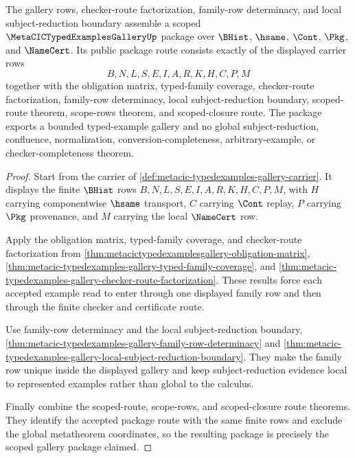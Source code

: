 \begin{theorem}
\label{thm:metacic-typed-examples-gallery-scoped-package}
The gallery rows, checker-route factorization, family-row determinacy, and local subject-reduction boundary assemble a scoped $\MetaCICTypedExamplesGalleryUp$ package over $\BHist$, $\hsame$, $\Cont$, $\Pkg$, and $\NameCert$. Its public package route consists exactly of the displayed carrier rows
$$
B,N,L,S,E,I,A,R,K,H,C,P,M
$$
together with the obligation matrix, typed-family coverage, checker-route factorization, family-row determinacy, local subject-reduction boundary, scoped-route theorem, scope-rows theorem, and scoped-closure route. The package exports a bounded typed-example gallery and no global subject-reduction, confluence, normalization, conversion-completeness, arbitrary-example, or checker-completeness theorem.
\end{theorem}
\begin{proof}
Start from the carrier of \autoref{def:metacic-typedexamples-gallery-carrier}. It displays the finite $\BHist$ rows $B,N,L,S,E,I,A,R,K,H,C,P,M$, with $H$ carrying componentwise $\hsame$ transport, $C$ carrying $\Cont$ replay, $P$ carrying $\Pkg$ provenance, and $M$ carrying the local $\NameCert$ row.

Apply the obligation matrix, typed-family coverage, and checker-route factorization from \autoref{thm:metacictypedexamplesgallery-obligation-matrix}, \autoref{thm:metacic-typedexamples-gallery-typed-family-coverage}, and \autoref{thm:metacic-typedexamples-gallery-checker-route-factorization}. These results force each accepted example read to enter through one displayed family row and then through the finite checker and certificate route.

Use family-row determinacy and the local subject-reduction boundary, \autoref{thm:metacic-typedexamples-gallery-family-row-determinacy} and \autoref{thm:metacic-typedexamples-gallery-local-subject-reduction-boundary}. They make the family row unique inside the displayed gallery and keep subject-reduction evidence local to represented examples rather than global to the calculus.

Finally combine the scoped-route, scope-rows, and scoped-closure route theorems. They identify the accepted package route with the same finite rows and exclude the global metatheorem coordinates, so the resulting package is precisely the scoped gallery package claimed.
\end{proof}

